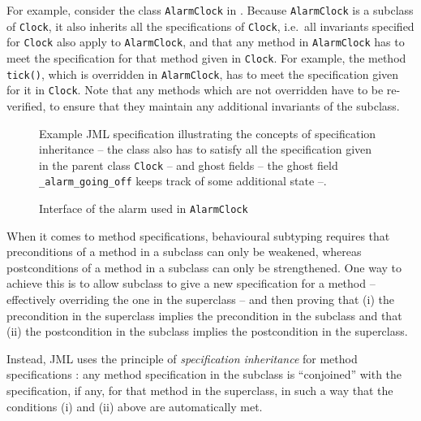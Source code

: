 \documentclass{llncs}
\begin{document}
For example, consider the class \texttt{AlarmClock} in .
Because \texttt{AlarmClock} is a subclass of \texttt{Clock}, it also
inherits all the specifications of \texttt{Clock}, i.e.\ 
all invariants specified for \texttt{Clock} also apply to \texttt{AlarmClock},
and that any method in \texttt{AlarmClock} has to meet the specification
for that method given in  \texttt{Clock}.
For example, the method \texttt{tick()}, which is overridden in \texttt{AlarmClock},
has to meet the specification given for it in \texttt{Clock}. 
Note that any methods which are not overridden have to be re-verified, to ensure 
that they maintain any additional invariants of the subclass.

\begin{figure}[tbp] 
%

%
\vspace*{-2ex} %
\caption{\label{Example:alarmclock}Example JML specification illustrating the concepts of 
specification inheritance -- the class also has to satisfy all
the specification given in the parent class \texttt{Clock} -- and 
ghost fields -- the ghost field \texttt{\_alarm\_going\_off}
keeps track of some additional state --.}
\end{figure}

\begin{figure}[tbp] \label{Example:alarminterface}
%

%
\vspace*{-2ex} %
\caption{Interface of the alarm used in \texttt{AlarmClock}}
\end{figure}

When it comes to method specifications, behavioural subtyping requires
that preconditions of a method in a subclass can only  be weakened,
whereas postconditions of a method in a subclass can only  be strengthened.
One way to achieve this is to allow subclass to give a new specification
for a method -- effectively overriding the one in the superclass --
and then proving that (i) the precondition in the superclass implies the
precondition in the subclass and that (ii) the postcondition in the subclass
implies the postcondition in the superclass.

Instead, JML uses the principle of \emph{specification inheritance} 
for method specifications \cite{Dhara-Leavens96}: any method specification
in the subclass is ``conjoined'' with the specification, if any, for that
method in the superclass, in such a way that the conditions (i) and (ii) above 
are automatically met.
\end{document}
